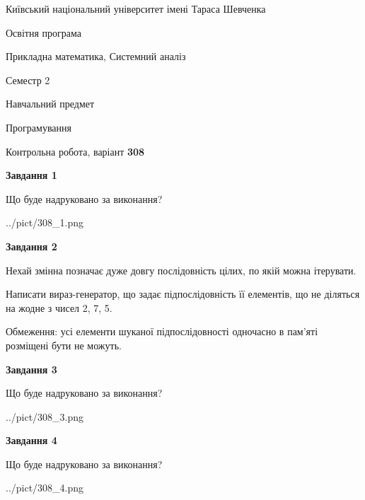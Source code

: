 \documentclass[12pt, ukrainian]{article}
\begin{document}
{{\begin {small}\par
{ \center  Київський національний університет імені Тараса Шевченка \par}
{\parbox {5 cm}{Освітня програма \hfill}{\parbox {8 cm}{Прикладна математика, Системний аналіз \hfill}}\parbox {5 cm}{\hfill Семестр 2}}\par
{\parbox {5 cm} {Навчальний предмет \hfill}\parbox {7 cm}{Програмування \hfill}\parbox {6cm}{\hfill}\par}\vspace{-7pt} \end{small}}{\center Контрольна робота, варіант  \No \textbf
{ 308 }\par}}
{
\begin {large}
{\begin {center}\textbf{Завдання 1}\end {center}}\par
Що буде надруковано за виконання?\par\par
\begin{center}
	{../pict/308_1.png}
\end{center}
\newpage

{\begin {center}\textbf{Завдання 2}\end {center}}\par
Нехай змінна  позначає дуже довгу послідовність цілих, по якій можна ітерувати.

Написати вираз-генератор, що задає підпослідовність її елементів, що не діляться на жодне з чисел 2, 7, 5.

Обмеження: усі елементи шуканої підпослідовності одночасно в пам'яті розміщені бути не можуть.\par
\newpage

{\begin {center}\textbf{Завдання 3}\end {center}}\par
Що буде надруковано за виконання?\par
\begin{center}
	{../pict/308_3.png}
\end{center}
\newpage

{\begin {center}\textbf{Завдання 4}\end {center}}\par
Що буде надруковано за виконання?\par
\begin{center}
	{../pict/308_4.png}
\end{center}
\newpage


\end{large}}
\end{document}
